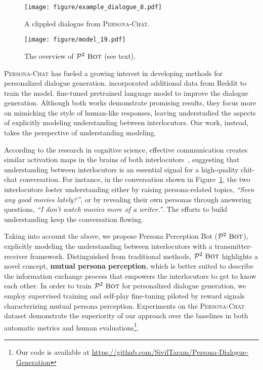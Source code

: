 \documentclass[11pt,a4paper]{article}
\begin{document}
\begin{figure}
    \centering
    \texttt{[image: figure/example\_dialogue\_8.pdf]}
    \caption{A clippled dialogue from \textsc{Persona-Chat}.}
    \label{fig:dialogue_example}
\end{figure}

\begin{figure*}
    \centering
    \texttt{[image: figure/model\_19.pdf]}
    \caption{The overview of $\mathcal{P}^2~\textsc{Bot}$ (see text).}
    \label{fig:model_framework}
\end{figure*}


\textsc{Persona-Chat} has fueled a growing interest in developing methods for personalized dialogue generation. \citet{mazare2018training} incorporated additional data from Reddit to train the model. \citet{wolf2019transfertransfo} fine-tuned pretrained language model \cite{Radford2018ImprovingLU} to improve the dialogue generation. Although both works demonstrate promising results, they focus more on mimicking the style of human-like responses, leaving understudied the aspects of explicitly modeling understanding between interlocutors. Our work, instead, takes the perspective of understanding modeling.

According to the research in cognitive science, effective communication creates similar activation maps in the brains of both interlocutors~\cite{hasson2012brain}, suggesting that understanding between interlocutors is an essential signal for a high-quality chit-chat conversation. 
For instance, in the conversation shown in Figure~\ref{fig:dialogue_example}, the two interlocutors foster understanding either by raising persona-related topics, \textit{``Seen any good movies lately?''}, or by revealing their own personas through answering questions, \textit{``I don't watch movies more of a writer.''}. The efforts to build understanding keep the conversation flowing.

Taking into account the above, we propose Persona Perception Bot ($\mathcal{P}^2~\textsc{Bot}$), explicitly modeling the understanding between interlocutors with a transmitter-receiver framework. Distinguished from traditional methods, $\mathcal{P}^2~\textsc{Bot}$ highlights a novel concept, \textbf{mutual persona perception}, which is better suited to describe the information exchange process that empowers the interlocutors to get to know each other. In order to train $\mathcal{P}^2~\textsc{Bot}$ for personalized dialogue generation, we employ supervised training and self-play fine-tuning piloted by reward signals characterizing mutual persona perception. Experiments on the \textsc{Persona-Chat} dataset demonstrate the superiority of our approach over the baselines in both automatic metrics and human evaluations\footnote{Our code is available at \url{https://github.com/SivilTaram/Persona-Dialogue-Generation}}.
\end{document}
